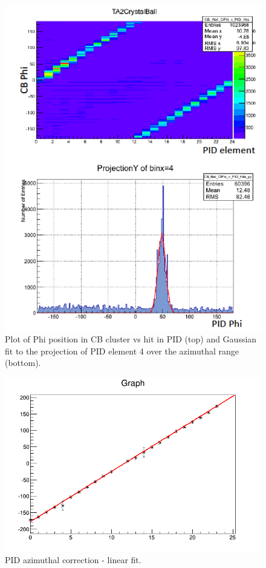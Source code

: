\begin{figure}[H]
\begin{center}
\includegraphics[scale=0.55]{pictures/png/pidphi.png}
\caption{Plot of Phi position in CB cluster vs hit in PID (top) and Gaussian fit to the projection of PID element 4 over the azimuthal range (bottom).}
\label{pidphi}
\end{center}
\end{figure}

\begin{figure}[H]
\begin{center}
\includegraphics[scale=0.4]{pictures/png/pidcali4.png}
\caption{PID azimuthal correction - linear fit.}
\label{pidphi2}
\end{center}
\end{figure}

